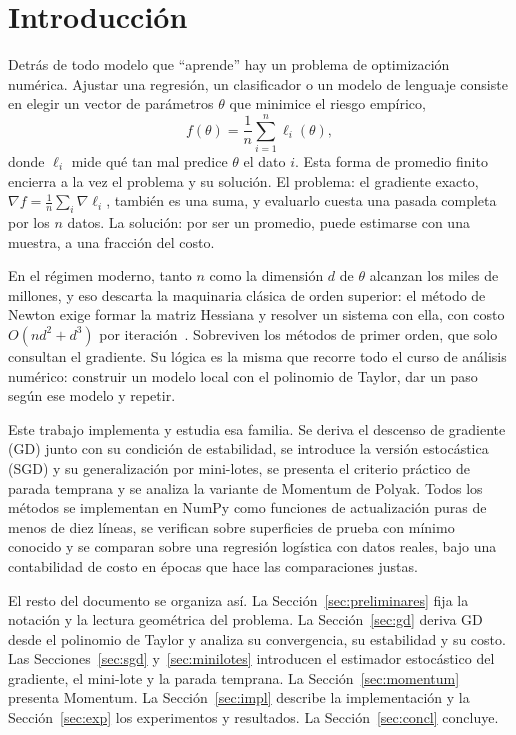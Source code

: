 \section{Introducción}\label{sec:intro}

Detrás de todo modelo que ``aprende'' hay un problema de optimización numérica. Ajustar una regresión, un clasificador o un modelo de lenguaje consiste en elegir un vector de parámetros $\theta$ que minimice el riesgo empírico,
\begin{equation}
  f(\theta) = \frac{1}{n}\sum_{i=1}^{n} \ell_i(\theta),
  \label{eq:erm}
\end{equation}
donde $\ell_i$ mide qué tan mal predice $\theta$ el dato $i$. Esta forma de promedio finito encierra a la vez el problema y su solución. El problema: el gradiente exacto, $\nabla f = \frac{1}{n}\sum_i \nabla\ell_i$, también es una suma, y evaluarlo cuesta una pasada completa por los $n$ datos. La solución: por ser un promedio, puede estimarse con una muestra, a una fracción del costo.

En el régimen moderno, tanto $n$ como la dimensión $d$ de $\theta$ alcanzan los miles de millones, y eso descarta la maquinaria clásica de orden superior: el método de Newton exige formar la matriz Hessiana y resolver un sistema con ella, con costo $O(nd^2 + d^3)$ por iteración~\cite{bottou2018}. Sobreviven los métodos de primer orden, que solo consultan el gradiente. Su lógica es la misma que recorre todo el curso de análisis numérico: construir un modelo local con el polinomio de Taylor, dar un paso según ese modelo y repetir.

Este trabajo implementa y estudia esa familia. Se deriva el descenso de gradiente (GD) junto con su condición de estabilidad, se introduce la versión estocástica (SGD) y su generalización por mini-lotes, se presenta el criterio práctico de parada temprana y se analiza la variante de Momentum de Polyak. Todos los métodos se implementan en NumPy como funciones de actualización puras de menos de diez líneas, se verifican sobre superficies de prueba con mínimo conocido y se comparan sobre una regresión logística con datos reales, bajo una contabilidad de costo en épocas que hace las comparaciones justas.

El resto del documento se organiza así. La Sección~\ref{sec:preliminares} fija la notación y la lectura geométrica del problema. La Sección~\ref{sec:gd} deriva GD desde el polinomio de Taylor y analiza su convergencia, su estabilidad y su costo. Las Secciones~\ref{sec:sgd} y~\ref{sec:minilotes} introducen el estimador estocástico del gradiente, el mini-lote y la parada temprana. La Sección~\ref{sec:momentum} presenta Momentum. La Sección~\ref{sec:impl} describe la implementación y la Sección~\ref{sec:exp} los experimentos y resultados. La Sección~\ref{sec:concl} concluye.
